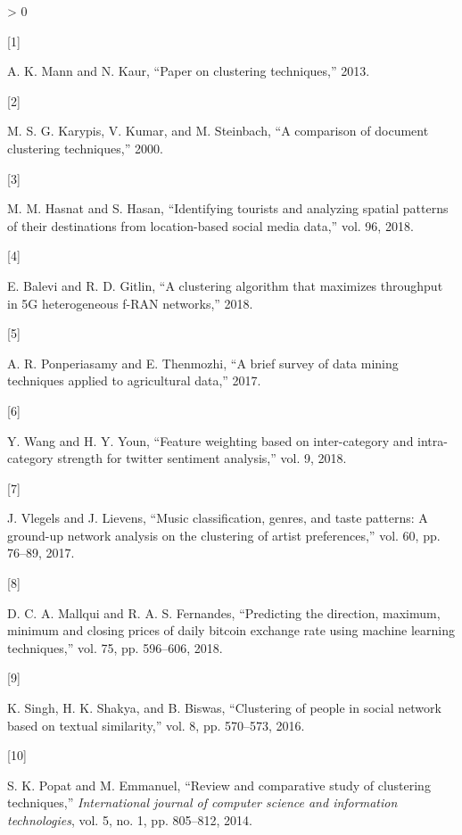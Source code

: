 \documentclass[
]{article}
\newlength{\cslhangindent}
\newlength{\csllabelwidth}
\newenvironment{CSLReferences}[3] %
 {%
  \setlength{\parindent}{0pt}
  \ifodd #1 \everypar{\setlength{\hangindent}{\cslhangindent}}\ignorespaces\fi
  \ifnum #2 > 0
  \setlength{\parskip}{#2\baselineskip}
  \fi
 }%
 {}
\newcommand{\CSLLeftMargin}[1]{\parbox[t]{\csllabelwidth}{#1}}
\newcommand{\CSLRightInline}[1]{\parbox[t]{\linewidth - \csllabelwidth}{#1}}
\begin{document}
\hypertarget{refs}{}
\begin{CSLReferences}{0}{0}
\leavevmode\hypertarget{ref-b46}{}%
\CSLLeftMargin{{[}1{]} }
\CSLRightInline{A. K. Mann and N. Kaur, {``Paper on clustering
techniques,''} 2013.}

\leavevmode\hypertarget{ref-b47}{}%
\CSLLeftMargin{{[}2{]} }
\CSLRightInline{M. S. G. Karypis, V. Kumar, and M. Steinbach, {``A
comparison of document clustering techniques,''} 2000.}

\leavevmode\hypertarget{ref-b1}{}%
\CSLLeftMargin{{[}3{]} }
\CSLRightInline{M. M. Hasnat and S. Hasan, {``Identifying tourists and
analyzing spatial patterns of their destinations from location-based
social media data,''} vol. 96, 2018.}

\leavevmode\hypertarget{ref-b2}{}%
\CSLLeftMargin{{[}4{]} }
\CSLRightInline{E. Balevi and R. D. Gitlin, {``A clustering algorithm
that maximizes throughput in 5G heterogeneous f-RAN networks,''} 2018.}

\leavevmode\hypertarget{ref-b3}{}%
\CSLLeftMargin{{[}5{]} }
\CSLRightInline{A. R. Ponperiasamy and E. Thenmozhi, {``A brief survey
of data mining techniques applied to agricultural data,''} 2017.}

\leavevmode\hypertarget{ref-b4}{}%
\CSLLeftMargin{{[}6{]} }
\CSLRightInline{Y. Wang and H. Y. Youn, {``Feature weighting based on
inter-category and intra-category strength for twitter sentiment
analysis,''} vol. 9, 2018.}

\leavevmode\hypertarget{ref-b5}{}%
\CSLLeftMargin{{[}7{]} }
\CSLRightInline{J. Vlegels and J. Lievens, {``Music classification,
genres, and taste patterns: A ground-up network analysis on the
clustering of artist preferences,''} vol. 60, pp. 76--89, 2017.}

\leavevmode\hypertarget{ref-b6}{}%
\CSLLeftMargin{{[}8{]} }
\CSLRightInline{D. C. A. Mallqui and R. A. S. Fernandes, {``Predicting
the direction, maximum, minimum and closing prices of daily bitcoin
exchange rate using machine learning techniques,''} vol. 75, pp.
596--606, 2018.}

\leavevmode\hypertarget{ref-b7}{}%
\CSLLeftMargin{{[}9{]} }
\CSLRightInline{K. Singh, H. K. Shakya, and B. Biswas, {``Clustering of
people in social network based on textual similarity,''} vol. 8, pp.
570--573, 2016.}

\leavevmode\hypertarget{ref-b48}{}%
\CSLLeftMargin{{[}10{]} }
\CSLRightInline{S. K. Popat and M. Emmanuel, {``Review and comparative
study of clustering techniques,''} \emph{International journal of
computer science and information technologies}, vol. 5, no. 1, pp.
805--812, 2014.}


\end{CSLReferences}
\end{document}
